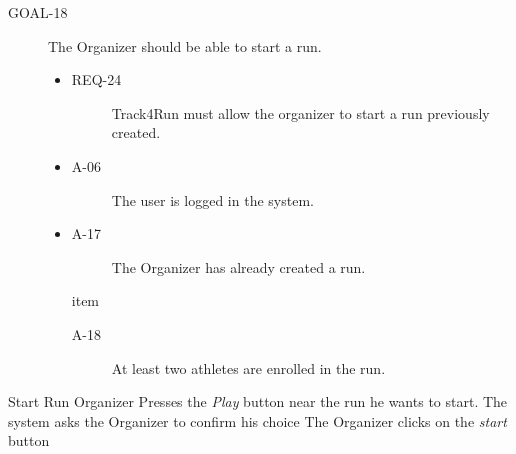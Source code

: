 \documentclass[a4paper]{article}
\newcommand{\requirement}{\ding{229}}%
\begin{document}
        
        \begin{description}
        	\item[GOAL-18] The Organizer should be able to start a run.
            	\begin{itemize}
            	    \item[\requirement]
                	\begin{description}
                	\item[REQ-24] Track4Run must allow the organizer to start a run previously created.
                	\end{description}
                	\item
                	\begin{description}
                	\item[A-06] The user is logged in the system.
                	\end{description}
                	\item
                	\begin{description}
                	\item[A-17] The Organizer has already created a run.  
                	\end{description}
                	item
                	\begin{description}
                	\item[A-18] At least two athletes are enrolled in the run.
                	\end{description}
                	\end{itemize}
        \end{description}
        
        
        \begin{usecase}{Start Run}
              {Organizer Presses the \textit{Play} button near the run he wants to start.}
              {The system asks the Organizer to confirm his choice}
              {The Organizer clicks on the \textit{start} button}
        \end{usecase}
        
\end{document}
